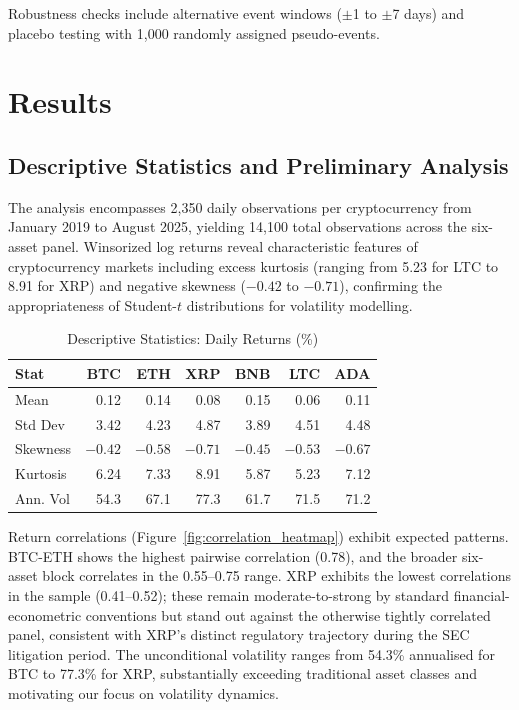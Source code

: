 \documentclass[pdflatex,sn-mathphys-num]{sn-jnl}
\theoremstyle{thmstyleone}
\theoremstyle{thmstyletwo}
\theoremstyle{thmstylethree}
\begin{document}
Robustness checks include alternative event windows ($\pm$1 to $\pm$7 days) and placebo testing with 1,000 randomly assigned pseudo-events.


\section{Results}\label{sec:results}

\subsection{Descriptive Statistics and Preliminary Analysis}

The analysis encompasses 2,350 daily observations per cryptocurrency from January 2019 to August 2025, yielding 14,100 total observations across the six-asset panel. Winsorized log returns reveal characteristic features of cryptocurrency markets including excess kurtosis (ranging from 5.23 for LTC to 8.91 for XRP) and negative skewness ($-0.42$ to $-0.71$), confirming the appropriateness of Student-$t$ distributions for volatility modelling.

\begin{table}[htbp]
\centering
\caption{Descriptive Statistics: Daily Returns (\%)}\label{tab:descriptive}
\small
\begin{tabular}{@{}lrrrrrr@{}}
\toprule
\textbf{Stat} & \textbf{BTC} & \textbf{ETH} & \textbf{XRP} & \textbf{BNB} & \textbf{LTC} & \textbf{ADA} \\
\midrule
Mean & 0.12 & 0.14 & 0.08 & 0.15 & 0.06 & 0.11 \\
Std Dev & 3.42 & 4.23 & 4.87 & 3.89 & 4.51 & 4.48 \\
Skewness & $-0.42$ & $-0.58$ & $-0.71$ & $-0.45$ & $-0.53$ & $-0.67$ \\
Kurtosis & 6.24 & 7.33 & 8.91 & 5.87 & 5.23 & 7.12 \\
Ann. Vol & 54.3 & 67.1 & 77.3 & 61.7 & 71.5 & 71.2 \\
\bottomrule
\end{tabular}
\end{table}

Return correlations (Figure~\ref{fig:correlation_heatmap}) exhibit expected patterns. BTC-ETH shows the highest pairwise correlation (0.78), and the broader six-asset block correlates in the 0.55--0.75 range. XRP exhibits the lowest correlations in the sample (0.41--0.52); these remain moderate-to-strong by standard financial-econometric conventions but stand out against the otherwise tightly correlated panel, consistent with XRP's distinct regulatory trajectory during the SEC litigation period. The unconditional volatility ranges from 54.3\% annualised for BTC to 77.3\% for XRP, substantially exceeding traditional asset classes and motivating our focus on volatility dynamics.
\end{document}
